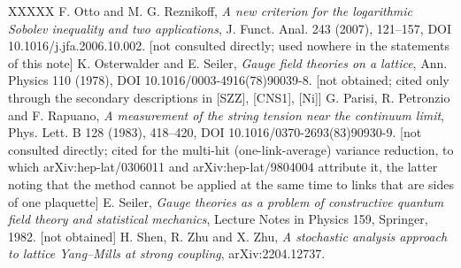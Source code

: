 \documentclass[11pt,a4paper]{article}
\theoremstyle{named}
\begin{document}
\begin{thebibliography}{XXXXX}
 F. Otto and M. G. Reznikoff, \textit{A new criterion for the logarithmic Sobolev inequality and two applications}, J. Funct. Anal. 243 (2007), 121–157, DOI 10.1016/j.jfa.2006.10.002. [not consulted directly; used nowhere in the statements of this note]
 K. Osterwalder and E. Seiler, \textit{Gauge field theories on a lattice}, Ann. Physics 110 (1978), DOI 10.1016/0003-4916(78)90039-8. [not obtained; cited only through the secondary descriptions in [SZZ], [CNS1], [Ni]]
 G. Parisi, R. Petronzio and F. Rapuano, \textit{A measurement of the string tension near the continuum limit}, Phys. Lett. B 128 (1983), 418–420, DOI 10.1016/0370-2693(83)90930-9. [not consulted directly; cited for the multi-hit (one-link-average) variance reduction, to which arXiv:hep-lat/0306011 and arXiv:hep-lat/9804004 attribute it, the latter noting that the method cannot be applied at the same time to links that are sides of one plaquette]
 E. Seiler, \textit{Gauge theories as a problem of constructive quantum field theory and statistical mechanics}, Lecture Notes in Physics 159, Springer, 1982. [not obtained]
 H. Shen, R. Zhu and X. Zhu, \textit{A stochastic analysis approach to lattice Yang–Mills at strong coupling}, arXiv:2204.12737.
\end{thebibliography}
\end{document}
